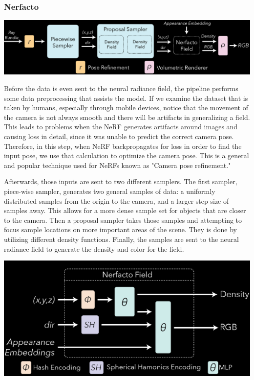 \documentclass{article}
\begin{document}
\subsubsection{Nerfacto}
\begin{center}
    \includegraphics[scale=0.2]{models_nerfacto_pipeline.png}
\end{center}
Before the data is even sent to the neural radiance field, the pipeline performs some data preprocessing that assists the model. If we examine the dataset that is taken by humans, especially through mobile devices, notice that the movement of the camera is not always smooth and there will be artifacts in generalizing a field. This leads to problems when the NeRF generates artifacts around images and causing loss in detail, since it was unable to predict the correct camera pose. Therefore, in this step, when NeRF backpropagates for loss in order to find the input pose, we use that calculation to optimize the camera pose. This is a general and popular technique used for NeRFs known as "Camera pose refinement."

Afterwards, those inputs are sent to two different samplers. The first sampler, piece-wise sampler, generates two general samples of data: a uniformly distributed samples from the origin to the camera, and a larger step size of samples away. This allows for a more dense sample set for objects that are closer to the camera. Then a proposal sampler takes those samples and attempting to focus sample locations on more important areas of the scene. They is done by utilizing different density functions. Finally, the samples are sent to the neural radiance field to generate the density and color for the field.

\begin{center}
    \includegraphics[scale=0.25]{models_nerfacto_field.png}
\end{center}
\end{document}
